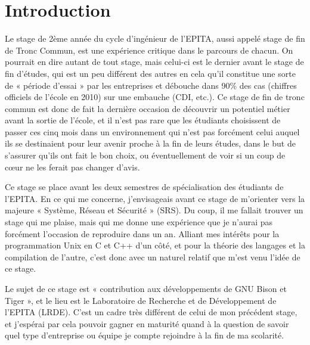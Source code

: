 \documentclass[a4paper,11pt,twoside,final]{article}
\begin{document}
  
  \cleardoublepage %
  \tableofcontents %
  \sloppy          %
  \cleardoublepage

  \setcounter{page}{1}
  \section*{Introduction} %

  Le stage de 2ème année du cycle d'ingénieur de l'EPITA, aussi appelé stage
  de fin de Tronc Commun, est une expérience critique dans le parcours de
  chacun. On pourrait en dire autant de tout stage, mais celui-ci est le
  dernier avant le stage de fin d'études, qui est un peu différent des autres
  en cela qu'il constitue une sorte de « période d'essai » par les entreprises
  et débouche dans 90\% des cas (chiffres officiels de l'école en 2010) sur une
  embauche (CDI, etc.). Ce stage de fin de tronc commun est donc de fait la
  dernière occasion de découvrir un potentiel métier avant la sortie de
  l'école, et il n'est pas rare que les étudiants choisissent de passer ces
  cinq mois dans un environnement qui n'est pas forcément celui auquel ils se
  destinaient pour leur avenir proche à la fin de leurs études, dans le but de
  s'assurer qu'ils ont fait le bon choix, ou éventuellement de voir si un coup
  de cœur ne les ferait pas changer d'avis.

  Ce stage se place avant les deux semestres de spécialisation des étudiants de
  l'EPITA\@. En ce qui me concerne, j'envisageais avant ce stage de m'orienter
  vers la majeure « Système, Réseau et Sécurité » (SRS). Du coup, il me fallait
  trouver un stage qui me plaise, mais qui me donne une expérience que je
  n'aurai pas forcément l'occasion de reproduire dans un an. Alliant mes
  intérêts pour la programmation Unix en C et C++ d'un côté, et pour
  la théorie des langages et la compilation de l'autre, c'est donc avec un
  naturel relatif que m'est venu l'idée de ce stage.

  Le sujet de ce stage est « contribution aux développements de GNU Bison et
  Tiger », et le lieu est le Laboratoire de Recherche et de Développement de
  l'EPITA (LRDE). C'est un cadre très différent de celui de mon précédent
  stage, et j'espérai par cela pouvoir gagner en maturité quand à la question
  de savoir quel type d'entreprise ou équipe je compte rejoindre à la fin de
  ma scolarité.
\end{document}
